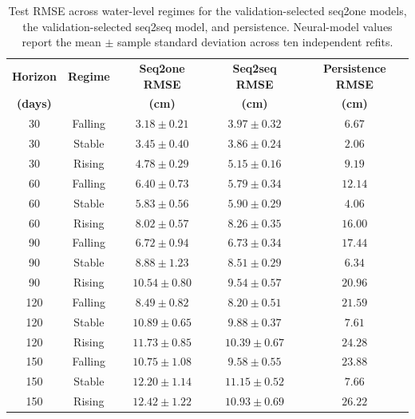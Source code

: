 \documentclass[conference]{IEEEtran}
\begin{document}
\begin{table}[!t]
    \centering
    \caption{Test RMSE across water-level regimes for the validation-selected seq2one models, the validation-selected seq2seq model, and persistence. Neural-model values report the mean $\pm$ sample standard deviation across ten independent refits.}
    \label{tab:rq3_regime_rmse}
    \small
    \setlength{\tabcolsep}{7pt}
    \begin{tabular}{@{}ccccc@{}}
        \hline
        \textbf{Horizon} &
        \textbf{Regime} &
        \textbf{Seq2one RMSE} &
        \textbf{Seq2seq RMSE} &
        \textbf{Persistence RMSE} \\
        \textbf{(days)} &
        &
        \textbf{(cm)} &
        \textbf{(cm)} &
        \textbf{(cm)} \\
        \hline

        30  & Falling & $\mathbf{3.18 \pm 0.21}$ & $3.97 \pm 0.32$ & $6.67$ \\
        30  & Stable  & $\mathbf{3.45 \pm 0.40}$ & $3.86 \pm 0.24$ & $2.06$ \\
        30  & Rising  & $\mathbf{4.78 \pm 0.29}$ & $5.15 \pm 0.16$ & $9.19$ \\
        \hline

        60  & Falling & $6.40 \pm 0.73$ & $\mathbf{5.79 \pm 0.34}$ & $12.14$ \\
        60  & Stable  & $\mathbf{5.83 \pm 0.56}$ & $5.90 \pm 0.29$ & $4.06$ \\
        60  & Rising  & $\mathbf{8.02 \pm 0.57}$ & $8.26 \pm 0.35$ & $16.00$ \\
        \hline

        90  & Falling & $\mathbf{6.72 \pm 0.94}$ & $6.73 \pm 0.34$ & $17.44$ \\
        90  & Stable  & $8.88 \pm 1.23$ & $\mathbf{8.51 \pm 0.29}$ & $6.34$ \\
        90  & Rising  & $10.54 \pm 0.80$ & $\mathbf{9.54 \pm 0.57}$ & $20.96$ \\
        \hline

        120 & Falling & $8.49 \pm 0.82$ & $\mathbf{8.20 \pm 0.51}$ & $21.59$ \\
        120 & Stable  & $10.89 \pm 0.65$ & $\mathbf{9.88 \pm 0.37}$ & $7.61$ \\
        120 & Rising  & $11.73 \pm 0.85$ & $\mathbf{10.39 \pm 0.67}$ & $24.28$ \\
        \hline

        150 & Falling & $10.75 \pm 1.08$ & $\mathbf{9.58 \pm 0.55}$ & $23.88$ \\
        150 & Stable  & $12.20 \pm 1.14$ & $\mathbf{11.15 \pm 0.52}$ & $7.66$ \\
        150 & Rising  & $12.42 \pm 1.22$ & $\mathbf{10.93 \pm 0.69}$ & $26.22$ \\
        \hline


\end{tabular}
\end{table}
\end{document}
